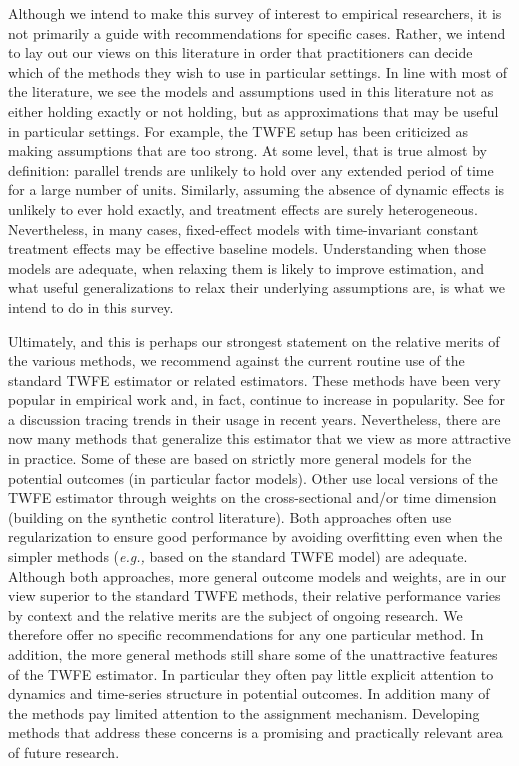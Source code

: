 \documentclass[letterpaper,12pt,leqno]{article}
\begin{document}
Although we intend to make this survey of interest to empirical researchers, it is not primarily a guide with recommendations for specific cases. Rather, we intend to lay out our views on this literature in order that practitioners can decide which of the methods they wish to use in particular settings. In line with most of the literature, we see the models and assumptions used in this literature not as either holding exactly or not holding, but as approximations that may be useful in particular settings. For example, the TWFE setup has been criticized as making assumptions that are too strong. At some level, that is true almost by definition: parallel trends are unlikely to hold over any extended period of time for a large number of units.  Similarly, assuming the absence of dynamic effects is unlikely to ever hold exactly, and treatment effects are surely heterogeneous. Nevertheless, in many cases, fixed-effect models with time-invariant constant treatment effects may be effective baseline models. Understanding when those models are adequate, when relaxing them is likely to improve estimation,  and what useful generalizations to relax their underlying assumptions are, is what we intend to do in this survey. 

Ultimately, and this is perhaps our strongest statement on the relative merits of the various methods, we recommend against the current routine use of the standard TWFE estimator or related estimators. 
These methods have been very popular in empirical work and, in fact, continue to increase in popularity. See \citep{goldsmith} for a discussion tracing trends in their usage in recent years.
Nevertheless, there are now many methods that generalize this estimator that we view as more attractive in practice. Some of these are based on strictly more general models for the potential outcomes (in particular factor models). Other use local versions of the TWFE estimator through weights on the cross-sectional and/or time dimension (building on the synthetic control literature). Both approaches often use regularization to ensure good performance by avoiding overfitting  even when the simpler methods ({\it e.g.,} based on the standard TWFE model) are adequate. Although both approaches, more general outcome models and weights, are in our view superior to the standard TWFE methods, their relative performance varies by context and the relative merits are the subject of ongoing research. We therefore offer no specific recommendations for any one particular method. In addition, the more general methods still share some of the unattractive features of the TWFE estimator.  In particular they often pay little explicit attention to dynamics and time-series structure in potential outcomes.
In addition many of the methods pay limited attention to the assignment mechanism.
Developing methods that address these concerns is a promising and practically relevant area of future research.
\end{document}
